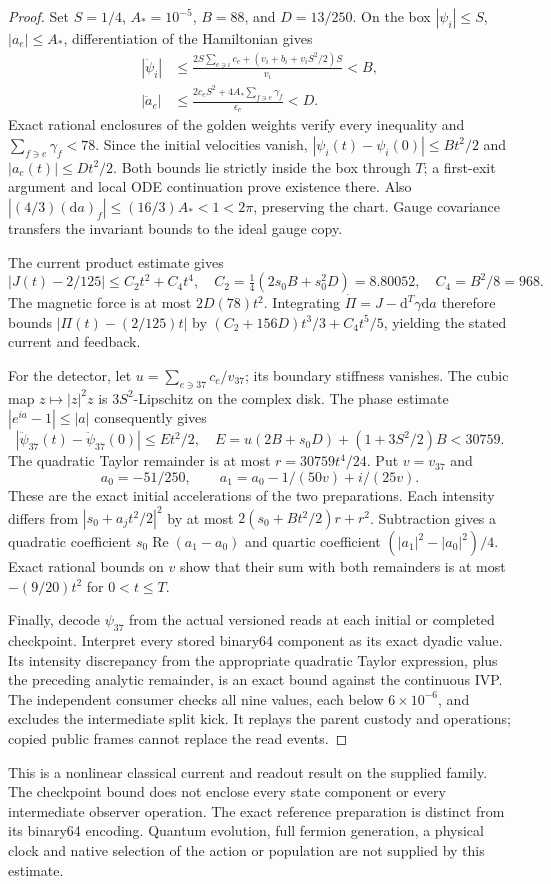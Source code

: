 \begin{proof}
Set $S=1/4$, $A_*=10^{-5}$, $B=88$, and $D=13/250$.
On the box $|\psi_i|\leq S$, $|a_e|\leq A_*$, differentiation of the
Hamiltonian gives
\begin{align*}
 |\ddot\psi_i|&\leq
 \frac{2S\sum_{e\ni i}c_e+(v_i+b_i+v_iS^2/2)S}{v_i}<B,\\
 |\ddot a_e|&\leq
 \frac{2c_eS^2+4A_*\sum_{f\ni e}\gamma_f}{\epsilon_e}<D.
\end{align*}
Exact rational enclosures of the golden weights verify every inequality
and $\sum_{f\ni e}\gamma_f<78$. Since the initial velocities vanish,
$|\psi_i(t)-\psi_i(0)|\leq Bt^2/2$ and $|a_e(t)|\leq Dt^2/2$.
Both bounds lie strictly inside the box through $T$; a first-exit
argument and local ODE continuation prove existence there. Also
$|(4/3)(\mathrm da)_f|\leq(16/3)A_*<1<2\pi$, preserving the chart.
Gauge covariance transfers the invariant bounds to the ideal gauge copy.

The current product estimate gives
\[
 |J(t)-2/125|\leq C_2t^2+C_4t^4,
 \quad C_2=\tfrac14(2s_0B+s_0^2D)=8.80052,
 \quad C_4=B^2/8=968.
\]
The magnetic force is at most $2D(78)t^2$. Integrating
$\dot\Pi=J-\mathrm d^T\gamma\mathrm da$ therefore bounds
$|\Pi(t)-(2/125)t|$ by
$(C_2+156D)t^3/3+C_4t^5/5$, yielding the stated current and feedback.

For the detector, let $u=\sum_{e\ni37}c_e/v_{37}$; its boundary stiffness
vanishes. The cubic map $z\mapsto |z|^2z$ is $3S^2$-Lipschitz on the
complex disk. The phase estimate $|e^{ia}-1|\leq |a|$ consequently gives
\[
 |\ddot\psi_{37}(t)-\ddot\psi_{37}(0)|\leq Et^2/2,
 \quad E=u(2B+s_0D)+(1+3S^2/2)B<30759.
\]
The quadratic Taylor remainder is at most $r=30759t^4/24$.
Put $v=v_{37}$ and
\[
 a_0=-51/250,\qquad
 a_1=a_0-1/(50v)+i/(25v).
\]
These are the exact initial accelerations of the two preparations.
Each intensity differs from $|s_0+a_jt^2/2|^2$ by at most
$2(s_0+Bt^2/2)r+r^2$. Subtraction gives a quadratic coefficient
$s_0\operatorname{Re}(a_1-a_0)$ and quartic coefficient
$(|a_1|^2-|a_0|^2)/4$. Exact rational bounds on $v$ show that their sum
with both remainders is at most $-(9/20)t^2$ for $0<t\leq T$.

Finally, decode $\psi_{37}$ from the actual versioned reads at each
initial or completed checkpoint. Interpret every stored binary64 component
as its exact dyadic value. Its intensity discrepancy from the appropriate
quadratic Taylor expression, plus the preceding analytic remainder, is
an exact bound against the continuous IVP. The independent consumer
checks all nine values, each below $6\times10^{-6}$, and excludes the
intermediate split kick. It replays the parent custody and operations;
copied public frames cannot replace the read events.
\end{proof}

This is a nonlinear classical current and readout result on the supplied
family. The checkpoint bound does not enclose every state component or
every intermediate observer operation. The exact reference preparation is
distinct from its binary64 encoding. Quantum evolution, full fermion
generation, a physical clock and native selection of the action or
population are not supplied by this estimate.
